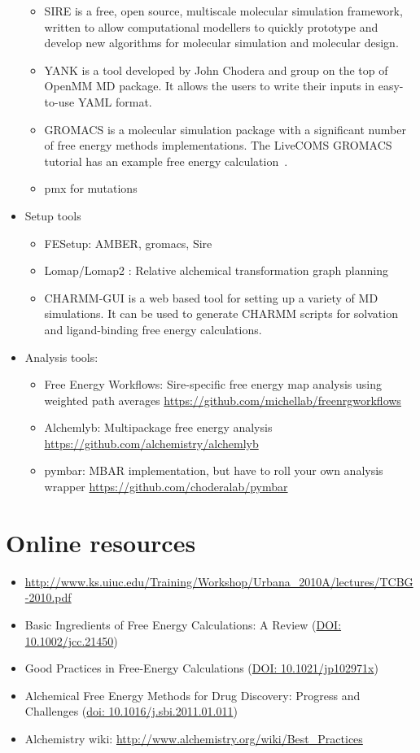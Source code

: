 \documentclass[9pt,bestpractices]{livecoms}
\begin{document}
\begin{itemize}
\begin{itemize}
	\item SIRE  is a free, open source, multiscale molecular simulation framework, written to allow computational modellers to quickly prototype and develop new algorithms for molecular simulation and molecular design. 
	\item YANK is a tool developed by John Chodera and group on the top of OpenMM MD package. It allows the users to write their inputs in easy-to-use YAML format.
	\item GROMACS is a molecular simulation package with a significant number of free energy methods implementations. The LiveCOMS GROMACS tutorial has an example free energy calculation~\cite{lemkul2018From}.
	\item pmx for mutations
	\end{itemize}
\item Setup tools
	\begin{itemize}
	\item FESetup: AMBER, gromacs, Sire
	\item Lomap/Lomap2 : Relative alchemical transformation graph planning
	\item CHARMM-GUI is a web based tool for setting up a variety of MD simulations. It can be used to generate CHARMM scripts for solvation and ligand-binding free energy calculations.
	\end{itemize}
\item Analysis tools:
	\begin{itemize}
	\item Free Energy Workflows: Sire-specific free energy map analysis using weighted path averages
	\url{https://github.com/michellab/freenrgworkflows}
	\item Alchemlyb: Multipackage free energy analysis
	\url{https://github.com/alchemistry/alchemlyb}
	\item pymbar: MBAR implementation, but have to roll your own analysis wrapper
	\url{https://github.com/choderalab/pymbar}
	\end{itemize}
\end{itemize}

\section{Online resources}
\begin{itemize}
\item \url{http://www.ks.uiuc.edu/Training/Workshop/Urbana_2010A/lectures/TCBG-2010.pdf}
\item Basic Ingredients of Free Energy Calculations: A Review (\url{DOI: 10.1002/jcc.21450})
\item Good Practices in Free-Energy Calculations (\url{DOI: 10.1021/jp102971x})
\item Alchemical Free Energy Methods for Drug Discovery: Progress and Challenges (\url{doi: 10.1016/j.sbi.2011.01.011})
\item Alchemistry wiki: \url{http://www.alchemistry.org/wiki/Best_Practices}
\end{itemize}
\end{document}
